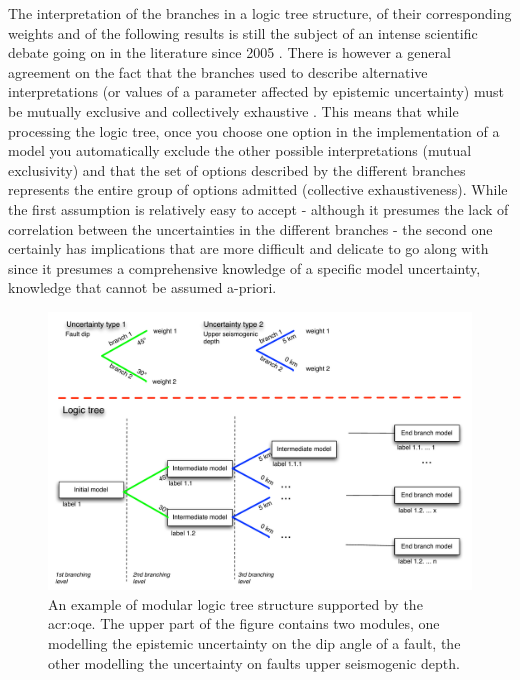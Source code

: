 The interpretation of the branches in a logic tree structure, of their 
corresponding weights and of the following results is still the subject 
of an intense scientific debate going on in the literature since 2005 
\parencite{abrahamson2005,mcguire2005,scherbaum2011,musson2012}.
%
There is however a general agreement on the fact that the branches used to 
describe alternative interpretations (or values of a parameter affected by
epistemic uncertainty) must be mutually exclusive and collectively exhaustive
\parencite{bommer2008}. 
%
This means that while processing the logic tree, once you choose one option 
in the implementation of a model you automatically exclude the other possible 
interpretations (mutual exclusivity) and that the set of options described 
by the different branches represents the entire group of options admitted 
(collective exhaustiveness). 
%
While the first assumption is relatively easy to accept - although it presumes 
the lack of correlation between the uncertainties in the different branches - 
the second one certainly has implications that are more difficult and delicate 
to go along with since it presumes a comprehensive knowledge of a specific 
model uncertainty, knowledge that cannot be assumed a-priori. 
%
\begin{figure}[!ht]
\includegraphics[width=\textwidth]{./Pictures/lts/logic_tree.pdf}
\caption{An example of modular logic tree structure supported by the
    \gls{acr:oqe}. The upper part of the figure contains two modules, one
    modelling the epistemic uncertainty on the dip angle of a fault, the 
    other modelling the uncertainty on faults upper seismogenic depth.}
\label{fig:logic_tree}
\end{figure}
%
